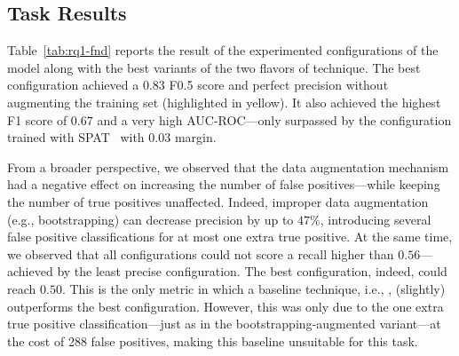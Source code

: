 \subsection{\finding Task Results}
\label{subsec:fnd-results}



Table~\ref{tab:rq1-fnd} reports the result of the \finderConfigsLetter experimented configurations of the \finder model along with the best variants of the two flavors of \vocab technique.
%
The best configuration achieved a $0.83$ F0.5 score and perfect precision without augmenting the training set (highlighted in yellow).
It also achieved the highest F1 score of $0.67$ and a very high AUC-ROC---only surpassed by the configuration trained with SPAT~\cite{yu:jss2022:spat} with $0.03$ margin.

From a broader perspective, we observed that the data augmentation mechanism had a negative effect on increasing the number of false positives---while keeping the number of true positives unaffected.
Indeed, improper data augmentation (e.g., bootstrapping) can decrease precision by up to $47\%$, introducing several false positive classifications for at most one extra true positive.
%
At the same time, we observed that all configurations could not score a recall higher than $0.56$---achieved by the least precise configuration.
The best configuration, indeed, could reach $0.50$.
This is the only metric in which a baseline technique, i.e., \identVocab, (slightly) outperforms the best configuration.
However, this was only due to the one extra true positive classification---just as in the bootstrapping-augmented variant---at the cost of 288 false positives, making this baseline unsuitable for this task.

